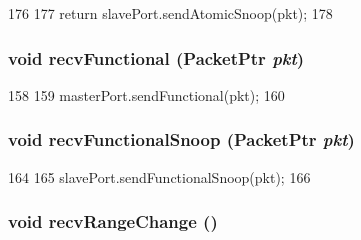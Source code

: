 \begin{DoxyCode}
176 {
177     return slavePort.sendAtomicSnoop(pkt);
178 }
\end{DoxyCode}
\hypertarget{classCommMonitor_aeefa907fb6d6a787e6dab90e8138ea90}{
\subsubsection[{recvFunctional}]{\setlength{\rightskip}{0pt plus 5cm}void recvFunctional ({\bf PacketPtr} {\em pkt})}}
\label{classCommMonitor_aeefa907fb6d6a787e6dab90e8138ea90}



\begin{DoxyCode}
158 {
159     masterPort.sendFunctional(pkt);
160 }
\end{DoxyCode}
\hypertarget{classCommMonitor_a284dfb90c168233c9d416bc07de8fefe}{
\subsubsection[{recvFunctionalSnoop}]{\setlength{\rightskip}{0pt plus 5cm}void recvFunctionalSnoop ({\bf PacketPtr} {\em pkt})}}
\label{classCommMonitor_a284dfb90c168233c9d416bc07de8fefe}



\begin{DoxyCode}
164 {
165     slavePort.sendFunctionalSnoop(pkt);
166 }
\end{DoxyCode}
\hypertarget{classCommMonitor_aecf310a01b533ae8700eccac2cf20480}{
\subsubsection[{recvRangeChange}]{\setlength{\rightskip}{0pt plus 5cm}void recvRangeChange ()}}
\label{classCommMonitor_aecf310a01b533ae8700eccac2cf20480}



